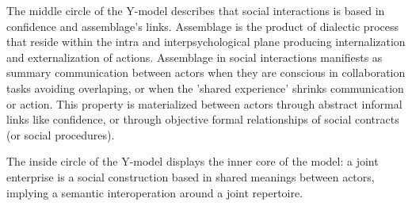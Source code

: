 \documentclass[10pt,twocolumn,ieeetran]{article}
\begin{document}
The middle circle of the Y-model describes that social interactions is based in confidence and assemblage's links. Assemblage is the product of dialectic process that reside within the intra and interpsychological plane \cite{Wertsch} producing internalization and externalization of actions. Assemblage in social interactions manifiests as summary communication between actors when they are conscious in collaboration tasks avoiding overlaping, or when the 'shared experience' shrinks communication or action. This property is materialized between actors through abstract informal links like confidence, or through objective formal relationships of social contracts (or social procedures).

The inside circle of the Y-model displays the inner core of the model: a joint enterprise is a social construction based in shared meanings between actors, implying a semantic interoperation around a joint repertoire. 





\end{document}
